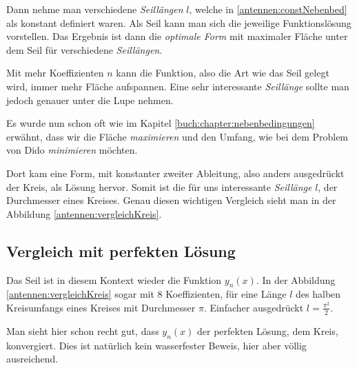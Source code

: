 Dann nehme man verschiedene \emph{Seillängen} $l$, welche in
\eqref{antennen:constNebenbed} als konstant definiert waren.
Als Seil kann man sich die jeweilige Funktionslösung vorstellen.
Das Ergebnis ist dann die \emph{optimale Form} mit
maximaler Fläche unter dem Seil für verschiedene \emph{Seillängen}.

Mit mehr Koeffizienten $n$ kann die Funktion, also die Art wie das Seil gelegt wird, immer mehr Fläche aufspannen. Eine sehr interessante \emph{Seillänge} sollte man jedoch genauer unter die Lupe nehmen.

Es wurde nun schon oft wie im Kapitel \ref{buch:chapter:nebenbedingungen}
erwähnt, dass wir die Fläche \emph{maximieren} und den Umfang, wie bei dem Problem von Dido \emph{minimieren} möchten. 

Dort kam eine Form, mit konstanter zweiter Ableitung, also anders ausgedrückt
der Kreis, als Lösung hervor. Somit ist die für uns interessante \emph{Seillänge} $l$, der Durchmesser eines Kreises. Genau diesen wichtigen Vergleich sieht man in der Abbildung \ref{antennen:vergleichKreis}. 

\subsection{Vergleich mit perfekten Lösung\label{antennen:vergleich}}

Das Seil ist in diesem Kontext wieder die Funktion $y_n(x)$. In der Abbildung \ref{antennen:vergleichKreis} sogar mit 8 Koeffizienten, für eine Länge $l$ des halben
Kreisumfangs eines Kreises mit Durchmesser $\pi$. Einfacher
ausgedrückt $l=\frac{\pi^2}{2}$.

Man sieht hier schon recht gut, dass $y_n(x)$ der
perfekten Lösung, dem Kreis, konvergiert. Dies ist
natürlich kein wasserfester Beweis, hier aber völlig
ausreichend. 


